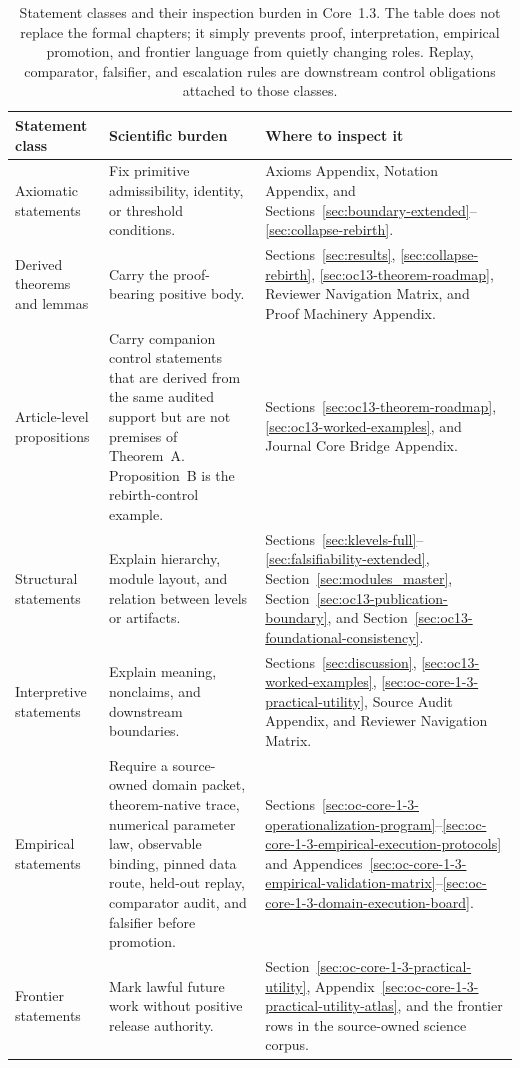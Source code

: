 \begin{table}[htbp]
\centering
\begingroup
\footnotesize
\RaggedRight
\setlength{\tabcolsep}{4pt}
\begin{tabular}{@{}L{0.21\textwidth}L{0.28\textwidth}L{0.39\textwidth}@{}}
\toprule
\textbf{Statement class} & \textbf{Scientific burden} & \textbf{Where to inspect it} \\
\midrule
Axiomatic statements & Fix primitive admissibility, identity, or threshold conditions. & Axioms Appendix, Notation Appendix, and Sections~\ref{sec:boundary-extended}--\ref{sec:collapse-rebirth}. \\
Derived theorems and lemmas & Carry the proof-bearing positive body. & Sections~\ref{sec:results}, \ref{sec:collapse-rebirth}, \ref{sec:oc13-theorem-roadmap}, Reviewer Navigation Matrix, and Proof Machinery Appendix. \\
Article-level propositions & Carry companion control statements that are derived from the same audited support but are not premises of Theorem~A. Proposition~B is the rebirth-control example. & Sections~\ref{sec:oc13-theorem-roadmap}, \ref{sec:oc13-worked-examples}, and Journal Core Bridge Appendix. \\
Structural statements & Explain hierarchy, module layout, and relation between levels or artifacts. & Sections~\ref{sec:klevels-full}--\ref{sec:falsifiability-extended}, Section~\ref{sec:modules_master}, Section~\ref{sec:oc13-publication-boundary}, and Section~\ref{sec:oc13-foundational-consistency}. \\
Interpretive statements & Explain meaning, nonclaims, and downstream boundaries. & Sections~\ref{sec:discussion}, \ref{sec:oc13-worked-examples}, \ref{sec:oc-core-1-3-practical-utility}, Source Audit Appendix, and Reviewer Navigation Matrix. \\
Empirical statements & Require a source-owned domain packet, theorem-native trace, numerical parameter law, observable binding, pinned data route, held-out replay, comparator audit, and falsifier before promotion. & Sections~\ref{sec:oc-core-1-3-operationalization-program}--\ref{sec:oc-core-1-3-empirical-execution-protocols} and Appendices~\ref{sec:oc-core-1-3-empirical-validation-matrix}--\ref{sec:oc-core-1-3-domain-execution-board}. \\
Frontier statements & Mark lawful future work without positive release authority. & Section~\ref{sec:oc-core-1-3-practical-utility}, Appendix~\ref{sec:oc-core-1-3-practical-utility-atlas}, and the frontier rows in the source-owned science corpus. \\
\bottomrule
\end{tabular}
\endgroup
\caption{Statement classes and their inspection burden in Core~1.3. The table
does not replace the formal chapters; it simply prevents proof, interpretation,
empirical promotion, and frontier language from quietly changing roles. Replay,
comparator, falsifier, and escalation rules are downstream control obligations
attached to those classes.}
\label{tab:oc13-statement-classes}
\end{table}

